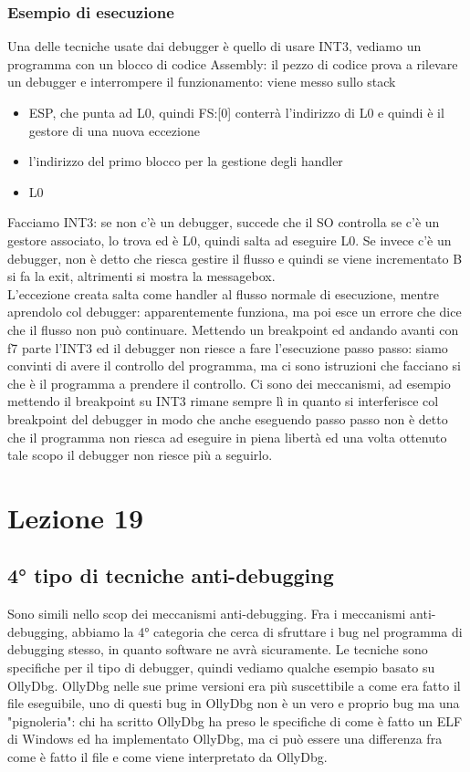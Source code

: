 \documentclass[12pt, oneside]{extbook}
\begin{document}
\subsection{Esempio di esecuzione}
Una delle tecniche usate dai debugger è quello di usare INT3, vediamo un programma con un blocco di codice Assembly: il pezzo di codice prova a rilevare un debugger e interrompere il funzionamento: viene messo sullo stack
\begin{itemize}
\item ESP, che punta ad L0, quindi FS:[0] conterrà l'indirizzo di L0 e quindi è il gestore di una nuova eccezione
\item l'indirizzo del primo blocco per la gestione degli handler
\item L0
\end{itemize}
Facciamo INT3: se non c'è un debugger, succede che il SO controlla se c'è un gestore associato, lo trova ed è L0, quindi salta ad eseguire L0. Se invece c'è un debugger, non è detto che riesca gestire il flusso e quindi se viene incrementato B si fa la exit, altrimenti si mostra la messagebox.\\L'eccezione creata salta come handler al flusso normale di esecuzione, mentre aprendolo col debugger: apparentemente funziona, ma poi esce un errore che dice che il flusso non può continuare. Mettendo un breakpoint ed andando avanti con f7 parte l'INT3 ed il debugger non riesce a fare l'esecuzione passo passo: siamo convinti di avere il controllo del programma, ma ci sono istruzioni che facciano si che è il programma a prendere il controllo. Ci sono dei meccanismi, ad esempio mettendo il breakpoint su INT3 rimane sempre lì in quanto si interferisce col breakpoint del debugger in modo che anche eseguendo passo passo non è detto che il programma non riesca ad eseguire in piena libertà ed una volta ottenuto tale scopo il debugger non riesce più a seguirlo.
\chapter{Lezione 19}
\section{4° tipo di tecniche anti-debugging}
Sono simili nello scop dei meccanismi anti-debugging. Fra i meccanismi anti-debugging, abbiamo la 4° categoria che cerca di sfruttare i bug nel programma di debugging stesso, in quanto software ne avrà sicuramente. Le tecniche sono specifiche per il tipo di debugger, quindi vediamo qualche esempio basato su OllyDbg. OllyDbg nelle sue prime versioni era più suscettibile a come era fatto il file eseguibile, uno di questi  bug in OllyDbg non è un vero e proprio bug ma una "pignoleria": chi ha scritto OllyDbg ha preso le specifiche di come è fatto un ELF di Windows ed ha implementato OllyDbg, ma ci può essere una differenza fra come è fatto il file e come viene interpretato da OllyDbg.
\end{document}
